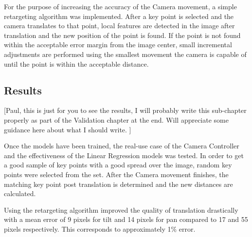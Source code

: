 \documentclass{l4proj}
\begin{document}
For the purpose of increasing the accuracy of the Camera movement, a simple retargeting algorithm was implemented. After a key point is selected and the camera translates to that point, local features are detected in the image after translation and the new position of the point is found. If the point is not found within the acceptable error margin from the image center, small incremental adjustments are performed using the smallest movement the camera is capable of until the point is within the acceptable distance. 



\subsection{Results}

 
[Paul, this is just for you to see the results, I will probably write this sub-chapter properly as part of the Validation chapter at the end. Will appreciate some guidance here about what I should write. ]
 
Once the models have been trained, the real-use case of the Camera Controller and the effectiveness of the Linear Regression models was tested. In order to get a good sample of key points with a good spread over the image, random key points were selected from the set. After the Camera movement finishes, the matching key point post translation is determined and the new distances are calculated. 

Using the retargeting algorithm improved the quality of translation drastically with a mean error of 9 pixels for tilt and 14 pixels for pan compared to 17 and 55 pixels respectively. This corresponds to approximately 1\% error.
\end{document}
